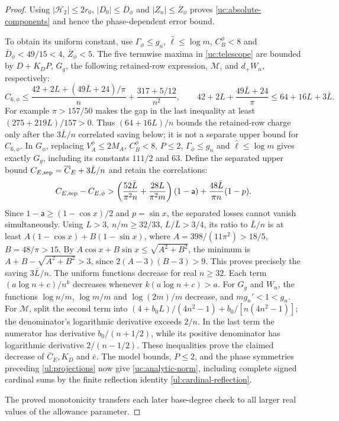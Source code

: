 \begin{proof}
Using $|\mathcal H_2|\leq2r_0$, $|D_0|\leq\overline D_\phi$
and $|Z_n|\leq\overline Z_\phi$ proves
\eqref{uc:absolute-components} and hence the phase-dependent error bound.

To obtain its uniform constant, use $\Gamma_\phi\leq g_n$,
$\hat{\ell}\leq\log m$, $C_B^\phi<8$ and
$\overline D_\phi<49/15<4$, $\overline Z_\phi<5$.
The five termwise maxima in \eqref{uc:telescope} are bounded by
$D+K_DP$, $G_g$, the following retained-row expression,
$\mathcal M$, and $d_+W_n$, respectively:
\[
 C_{6,\phi}\leq
 \frac{42+2L+(49\bar L+24)/\pi}{n}+\frac{317+5/12}{n^2},
 \qquad
 42+2L+\frac{49\bar L+24}{\pi}\leq64+16L+3\bar L.
\]
For example $\pi>157/50$ makes the gap in the last inequality
at least $(275+219L)/157>0$.
Thus $(64+16L)/n$ bounds the retained-row charge only after the
$3\bar L/n$ correlated saving below; it is not a separate upper
bound for $C_{6,\phi}$. In $G_\phi$, replacing
$V_A^\phi\leq2M_A$, $C_B^\phi<8$, $P\leq2$,
$\Gamma_\phi\leq g_n$ and $\hat\ell\leq\log m$ gives exactly
$G_g$, including its constants $111/2$ and $63$.
Define the separated upper bound
$C_{E,{\rm sep}}=\overline C_E+3\bar L/n$ and retain the correlations:
\[
 C_{E,{\rm sep}}-C_{E,\phi}>
 \left(\frac{52\bar{L}}{\pi^2n}+\frac{28L}{\pi^2m}\right)(1-\mathsf{a})
                +\frac{48\bar{L}}{\pi n}(1-p).
\]
Since $1-\mathsf a\geq(1-\cos x)/2$ and $p=\sin x$,
the separated losses cannot vanish simultaneously.
Using $L>3$, $n/m\geq32/33$, $L/\bar{L}>3/4$, its ratio to $\bar{L}/n$
is at least $A(1-\cos x)+B(1-\sin x)$, where
$A=398/(11\pi^2)>18/5$, $B=48/\pi>15$.
By $A\cos x+B\sin x\leq\sqrt{A^2+B^2}$,
the minimum is $A+B-\sqrt{A^2+B^2}>3$, since
$2(A-3)(B-3)>9$. This proves precisely the saving $3\bar{L}/n$.
The uniform functions decrease for real $n\geq32$.
Each term $(a\log n+c)/n^k$ decreases whenever
$k(a\log n+c)>a$. For $G_g$ and $W_n$, the functions
$\log n/m$, $\log m/m$ and $\log(2m)/m$ decrease, and
$mg_n'<1<g_n$. For $\mathcal M$, split the second term into
$(4+b_0L)/(4n^2-1)+b_0/[n(4n^2-1)]$; the denominator's
logarithmic derivative exceeds $2/n$. In the last term the numerator
has derivative $b_0/(n+1/2)$, while its positive denominator has
logarithmic derivative $2/(n-1/2)$. These inequalities prove the
claimed decrease of $\overline C_E,K_D$ and $\bar e$.
The model bounds, $P\leq2$, and the phase symmetries preceding
\eqref{ul:projections} now give
\eqref{uc:analytic-norm}, including complete signed cardinal sums by
the finite reflection identity \eqref{ul:cardinal-reflection}.

The proved monotonicity transfers each later base-degree check to all
larger real values of the allowance parameter.


\end{proof}
